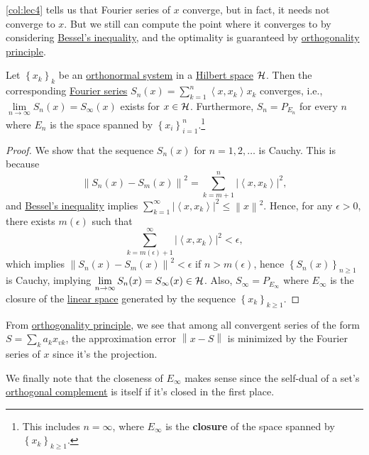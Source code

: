 \autoref{col:lec4} tells us that Fourier series of \(x\) converge, but in fact, it needs not converge to \(x\). But we still can compute the point where it converges to by considering \hyperref[thm:Bessel-ineq]{Bessel's inequality}, and the optimality is guaranteed by \hyperref[thm:orthogonality-principle]{orthogonality principle}.

\begin{theorem}
	Let \(\left\{ x_{k}\right\}_{k} \) be an \hyperref[def:orthonormal-system]{orthonormal system} in a \hyperref[def:Hilbert-space]{Hilbert space} \(\mathcal{\MakeUppercase{h}} \). Then the corresponding \hyperref[def:Fourier-series]{Fourier series} \(S_n(x) = \sum_{k=1}^{n} \left\langle  x, x_{k} \right\rangle  x_{k}\) converges, i.e., \(\lim\limits_{n \to \infty} S_{n} (x) = S_{\infty }(x)\) exists for \(x\in \mathcal{\MakeUppercase{h}} \). Furthermore, \(S_n = P_{E_n}\) for every \(n\) where \(E_n\) is the space spanned by \(\left\{ x_i \right\} _{i=1}^n\).\footnote{This includes \(n=\infty\), where \(E_\infty \) is the \textbf{closure} of the space spanned by \(\left\{ x_k \right\}_{k\geq 1} \).}
\end{theorem}
\begin{proof}
	We show that the sequence \(S_n(x)\) for \(n = 1, 2, \ldots\) is Cauchy. This is because
	\[
		\left\lVert S_n(x) - S_m(x)\right\rVert ^{2} = \sum_{k=m+1}^{n} \left\vert \left\langle x, x_{k}\right\rangle  \right\vert ^{2},
	\]
	and \hyperref[thm:Bessel-ineq]{Bessel's inequality} implies \(\sum_{k=1}^{\infty} \left\vert \left\langle x, x_{k}  \right\rangle  \right\vert ^{2} \leq \left\lVert x\right\rVert ^{2} \). Hence, for any \(\epsilon > 0\), there exists \(m(\epsilon )\) such that
	\[
		\sum_{k=m(\epsilon )+1}^{\infty} \left\vert \left\langle x, x_{k}  \right\rangle  \right\vert ^{2} < \epsilon,
	\]
	which implies \(\left\lVert S_n(x) - S_m(x)\right\rVert ^{2} < \epsilon \) if \(n > m(\epsilon )\), hence \(\left\{ S_{n} (x) \right\}_{n\geq 1}\) is Cauchy, implying \(\lim\limits_{n \to \infty} S_n(x)= S_\infty (x)\in \mathcal{\MakeUppercase{h}} \). Also, \(S_\infty = P_{E_\infty }\) where \(E_\infty \) is the closure of the \hyperref[def:linear-vector-space]{linear space} generated by the sequence \(\left\{ x_{k} \right\}_{k \geq 1}\).
\end{proof}

\begin{remark}
	From \hyperref[thm:orthogonality-principle]{orthogonality principle}, we see that among all convergent series of the form \(S = \sum_{k} a_k x_{vk} \), the approximation error \(\left\lVert x - S\right\rVert \) is minimized by the Fourier series of \(x\) since it's the projection.
\end{remark}

We finally note that the closeness of \(E_\infty \) makes sense since the self-dual of a set's \hyperref[def:orthogonal-complement]{orthogonal complement} is itself if it's closed in the first place.